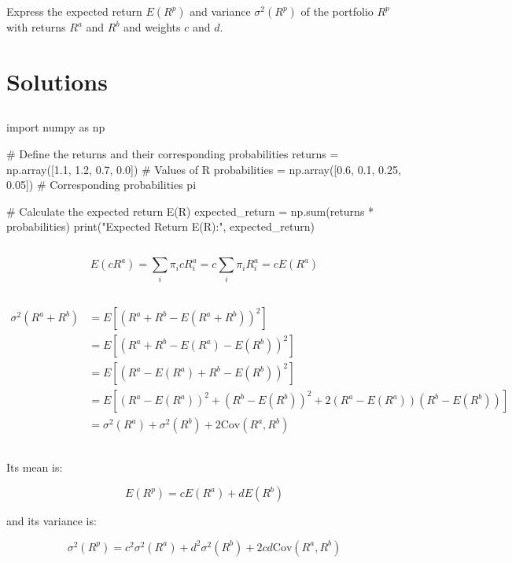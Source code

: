 Express the expected return $E(R^p)$ 
and variance $\sigma^2(R^p)$ of the
portfolio $R^p$ with returns $R^a$ and $R^b$
and weights $c$ and $d$.

\newpage
\section{Solutions}

\subsection{}

\begin{python}
import numpy as np

# Define the returns and their corresponding probabilities
returns = np.array([1.1, 1.2, 0.7, 0.0])  # Values of R
probabilities = np.array([0.6, 0.1, 0.25, 0.05])  # Corresponding probabilities pi

# Calculate the expected return E(R)
expected_return = np.sum(returns * probabilities)
print("Expected Return E(R):", expected_return)
\end{python}


\subsection{}

\begin{equation}
    E(cR^a) = \sum_i \pi_i c R^a_i  = c\sum_i  \pi_i R^a_i = cE(R^a)
\end{equation}

\subsection{}

\begin{align}
    \sigma^2(R^a + R^b) &= E[(R^a + R^b - E(R^a + R^b))^2] \\
    &= E[(R^a + R^b - E(R^a) - E(R^b))^2] \\
    &= E[(R^a - E(R^a) + R^b - E(R^b))^2] \\
    &= E[(R^a - E(R^a))^2 + (R^b - E(R^b))^2 + 2(R^a - E(R^a))(R^b - E(R^b))] \\
    &= \sigma^2(R^a) + \sigma^2(R^b) + 2\text{Cov}(R^a, R^b)
\end{align}

\subsection{}

Its mean is:

\begin{equation}
    E(R^p) = cE(R^a) + dE(R^b)
\end{equation}

and its variance is:

\begin{equation}
    \sigma^2(R^p) = c^2\sigma^2(R^a) + d^2\sigma^2(R^b) + 2cd\text{Cov}(R^a, R^b)
\end{equation}
